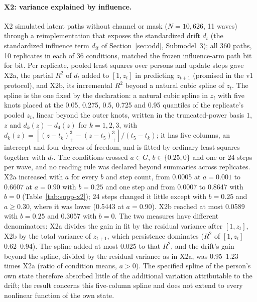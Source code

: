\paragraph{X2: variance explained by influence.}
X2 simulated latent paths without channel or mask ($N=10{,}626$, 11 waves) through a reimplementation that exposes the standardized drift $d_t$ (the standardized influence term $d_{it}$ of Section~\ref{sec:odd}, Submodel~3); all 360 paths, 10 replicates in each of 36 conditions, matched the frozen influence-arm path bit for bit. %
Per replicate, pooled least squares over persons and update steps gave X2a, the partial $R^2$ of $d_t$ added to $[1,z_t]$ in predicting $z_{t+1}$ (promised in the v1 protocol), and X2b, its incremental $R^2$ beyond a natural cubic spline of $z_t$. %
The spline is the one fixed by the declaration: a natural cubic spline in $z_t$ with five knots placed at the 0.05, 0.275, 0.5, 0.725 and 0.95 quantiles of the replicate's pooled $z_t$, linear beyond the outer knots, written in the truncated-power basis $1$, $z$ and $d_k(z)-d_4(z)$ for $k=1,2,3$, with $d_k(z)=[(z-t_k)_+^3-(z-t_5)_+^3]/(t_5-t_k)$; it has five columns, an intercept and four degrees of freedom, and is fitted by ordinary least squares together with $d_t$.
The conditions crossed $a\in G$, $b\in\{0.25,0\}$ and one or 24 steps per wave, and no reading rule was declared beyond summaries across replicates. %
X2a increased with $a$ for every $b$ and step count, from 0.0005 at $a=0.001$ to 0.6607 at $a=0.90$ with $b=0.25$ and one step and from 0.0007 to 0.8647 with $b=0$ (Table~\ref{tab:supp-x2}); 24 steps changed it little except with $b=0.25$ and $a\geq0.30$, where it was lower (0.5443 at $a=0.90$). %
X2b reached at most 0.0589 with $b=0.25$ and 0.3057 with $b=0$. %
The two measures have different denominators: X2a divides the gain in fit by the residual variance after $[1,z_t]$, X2b by the total variance of $z_{t+1}$, which persistence dominates ($R^2$ of $[1,z_t]$ 0.62--0.94). %
The spline added at most 0.025 to that $R^2$, and the drift's gain beyond the spline, divided by the residual variance as in X2a, was 0.95--1.23 times X2a (ratio of condition means, $a>0$). The specified spline of the person's own state therefore absorbed little of the additional variation attributable to the drift; the result concerns this five-column spline and does not extend to every nonlinear function of the own state. %

